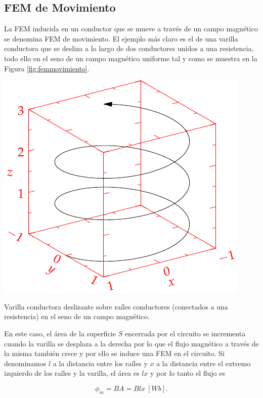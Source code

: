\documentclass{tufte-handout}
\begin{document}
\subsection{FEM de Movimiento}

La FEM inducida en un conductor que se mueve a través de un campo magnético se denomina FEM de movimiento. El ejemplo más claro es el de una varilla conductora que se desliza a lo largo de dos conductores unidos a una resistencia, todo ello en el seno de un campo magnético uniforme tal y como se muestra en la Figura \ref{fig:femmovimiento}.

\begin{marginfigure}%
    \includegraphics[width=\linewidth]{helix}
    \caption{Varilla conductora deslizante sobre raíles conductores (conectados a una resistencia) en el seno de un campo magnético.}
    \label{fig:femmovimiento}
\end{marginfigure}

En este caso, el área de la superficie $S$ encerrada por el circuito se incrementa cuando la varilla se desplaza a la derecha por lo que el flujo magnético a través de la misma también crece y por ello se induce una FEM en el circuito. Si denominamos $l$ a la distancia entre los raíles y $x$ a la distancia entre el extremo izquierdo de los raíles y la varilla, el área es $lx$ y por lo tanto el flujo es

\begin{equation}
\phi_m = BA = Blx~[Wb].
\end{equation}
\end{document}
